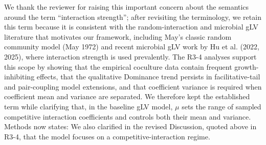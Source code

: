 \responselabel
We thank the reviewer for raising this important concern about the semantics around the term ``interaction strength''; after revisiting the terminology, we retain this term because it is consistent with the random-interaction and microbial gLV literature that motivates our framework, including May's classic random community model (May 1972) and recent microbial gLV work by Hu et al. (2022, 2025), where interaction strength is used prevalently. The R3-4 analyses support this scope by showing that the empirical coculture data contain frequent growth-inhibiting effects, that the qualitative Dominance trend persists in facilitative-tail and pair-coupling model extensions, and that coefficient variance is required when coefficient mean and variance are separated. We therefore kept the established term while clarifying that, in the baseline gLV model, $\mu$ sets the range of sampled competitive interaction coefficients and controls both their mean and variance. Methods now states:  We also clarified in the revised Discussion, quoted above in R3-4, that the model focuses on a competitive-interaction regime.
